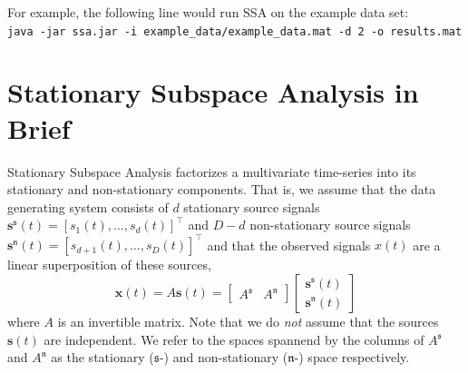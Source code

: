 \documentclass{article}
\newcommand{\1}{\ensuremath{\mathds{1}}}
\newcommand{\s}{\ensuremath{\mathfrak{s}}}
\newcommand{\n}{\ensuremath{\mathfrak{n}}}
\newcommand{\0}{\ensuremath{0}}
\begin{document}
For example, the following line would run SSA on the example data set:\\

\texttt{java -jar ssa.jar -i example\_data/example\_data.mat -d 2 -o results.mat}


\section{Stationary Subspace Analysis in Brief}

Stationary Subspace Analysis \cite{PRL:SSA:2009} factorizes a multivariate time-series 
into its stationary and non-stationary components. That is, we assume that the data 
generating system consists of $d$ stationary source signals 
${\mathbf s^\s}(t) = [s_1(t), \dots, s_d(t)]^\top$ and $D-d$ non-stationary source signals
${\mathbf s^\n}(t) = [s_{d+1}(t), \dots, s_D(t)]^\top$ and that the observed signals 
$x(t)$ are a linear superposition of these sources,
\begin{equation}
  {\mathbf x}(t) = A {\mathbf s}(t) = 
    \begin{bmatrix} A^{\s} & A^{\n} \end{bmatrix}
    \begin{bmatrix} {\mathbf s^{\s}}(t) \\ {\mathbf s^{\n}}(t) \end{bmatrix}
\label{eq:mixing_model}
\end{equation}
where $A$ is an invertible matrix. Note that we do \textit{not} assume that 
the sources ${\mathbf s}(t)$ are independent. We refer to the spaces spannend 
by the columns of $A^{\s}$ and $A^{\n}$ as the stationary ($\s$-) and 
non-stationary ($\n$-) space respectively.  
\end{document}
